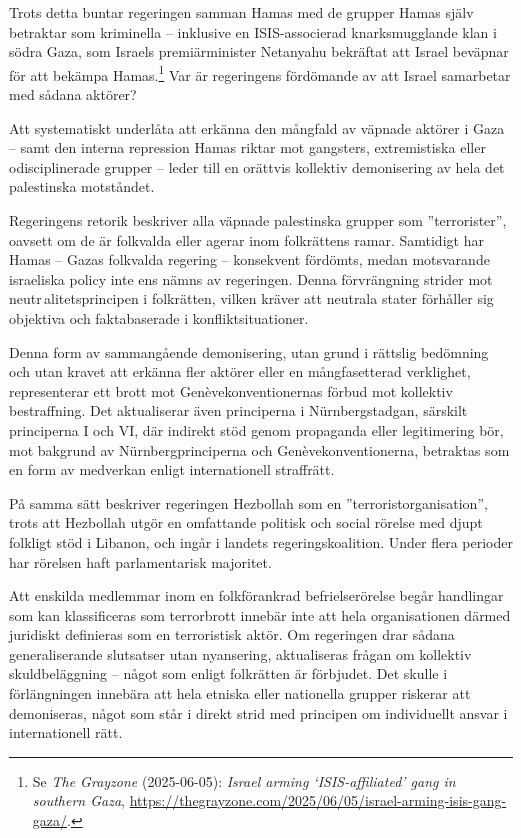 Trots detta buntar regeringen samman Hamas med de grupper Hamas själv betraktar som kriminella – inklusive en ISIS-associerad 
knarksmugglande klan i södra Gaza, som Israels premiärminister Netanyahu 
bekräftat att Israel beväpnar för att bekämpa Hamas.\footnote{Se \textit{The Grayzone} (2025-06-05): \textit{Israel arming ‘ISIS-affiliated’ gang in southern Gaza}, \url{https://thegrayzone.com/2025/06/05/israel-arming-isis-gang-gaza/}.} Var är regeringens fördömande av att Israel samarbetar med sådana aktörer?

Att systematiskt underlåta att erkänna den mångfald av väpnade aktörer i Gaza – samt den 
interna repression Hamas riktar mot gangsters, extremistiska eller odisciplinerade grupper – leder till en orättvis 
kollektiv demonisering av hela det palestinska motståndet. 

Regeringens retorik beskriver alla väpnade palestinska grupper som ”terrorister”, oavsett om de är folkvalda eller 
agerar inom folkrättens ramar. Samtidigt har Hamas – Gazas folkvalda regering – konsekvent fördömts, medan motsvarande israeliska policy inte ens nämns av regeringen.
Denna förvrängning strider mot neutr alitetsprincipen i folkrätten, vilken kräver att neutrala stater förhåller sig 
objektiva och faktabaserade i konfliktsituationer.

Denna form av sammangående demonisering, utan grund i rättslig bedömning och utan kravet att erkänna fler 
aktörer eller en mångfasetterad verklighet, representerar ett brott mot Genèvekonventionernas förbud mot kollektiv 
bestraffning. Det aktualiserar även principerna i Nürnbergstadgan, särskilt principerna I och VI, där indirekt stöd 
genom propaganda eller legitimering bör, mot bakgrund av Nürnbergprinciperna och Genèvekonventionerna, 
betraktas som en form av medverkan enligt internationell straffrätt.

På samma sätt beskriver regeringen Hezbollah som en ”terroristorganisation”, trots att Hezbollah utgör en omfattande 
politisk och social rörelse med djupt folkligt stöd i Libanon, och ingår i landets regeringskoalition. 
Under flera perioder har rörelsen haft parlamentarisk majoritet.

Att enskilda medlemmar inom en folkförankrad befrielserörelse begår handlingar som kan klassificeras som 
terrorbrott innebär inte att hela organisationen därmed juridiskt definieras som en terroristisk aktör. 
Om regeringen drar sådana generaliserande slutsatser utan nyansering, aktualiseras frågan om kollektiv skuldbeläggning – något 
som enligt folkrätten är förbjudet. Det skulle i förlängningen innebära att hela etniska eller nationella grupper 
riskerar att demoniseras, något som står i direkt strid med principen om individuellt ansvar i internationell rätt.

